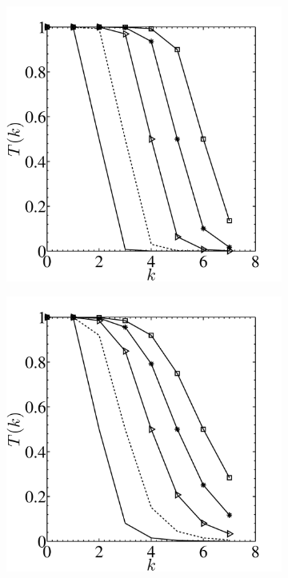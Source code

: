 \documentclass[times]{fldauth}
\begin{document}
\begin{figure}
\centering
        \begin{subfigure}[b]{0.32\textwidth}
                \includegraphics[width=\linewidth]{Figure/filter1.pdf}
                \caption{}
                \label{fig:filt1}
        \end{subfigure}%
          \begin{subfigure}[b]{0.32\textwidth}
         \centering
                \includegraphics[width=\linewidth]{Figure/filter2.pdf}

\end{subfigure}
\end{figure}
\end{document}
